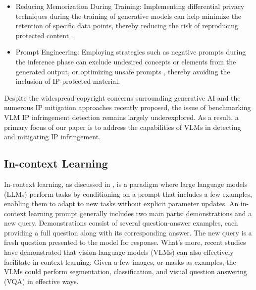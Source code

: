 \begin{itemize}
    \item Reducing Memorization During Training: Implementing differential privacy \cite{dwork2014algorithmic} techniques during the training of generative models can help minimize the retention of specific data points, thereby reducing the risk of reproducing protected content \cite{abadi2016deep, chen2022dpgen, dockhorn2022differentially}.
    \item Prompt Engineering: Employing strategies such as negative prompts during the inference phase can exclude undesired concepts or elements from the generated output\cite{wang2024evaluating, he2024fantastic}, or optimizing unsafe prompts \cite{chin2023prompting4debugging, rando2022red}, thereby avoiding the inclusion of IP-protected material.
\end{itemize}

Despite the widespread copyright concerns surrounding generative AI and the numerous IP mitigation approaches recently proposed, the issue of benchmarking VLM IP infringement detection remains largely underexplored. As a result, a primary focus of our paper is to address the capabilities of VLMs in detecting and mitigating IP infringement.

\subsection{In-context Learning}
In-context learning, as discussed in \cite{mann2020language, dong2022survey}, is a paradigm where large language models (LLMs) perform tasks by conditioning on a prompt that includes a few examples, enabling them to adapt to new tasks without explicit parameter updates. An in-context learning prompt generally includes two main parts: demonstrations and a new query. Demonstrations consist of several question-answer examples, each providing a full question along with its corresponding answer. The new query is a fresh question presented to the model for response. What's more, recent studies \cite{zhou2024visual,monajatipoor2023metavl,li2024visual, zhang2023makes} have demonstrated that vision-language models (VLMs) can also effectively facilitate in-context learning: Given a few images, or masks as examples, the VLMs could perform segmentation, classification, and visual question answering (VQA) \cite{antol2015vqa} in effective ways. 

%